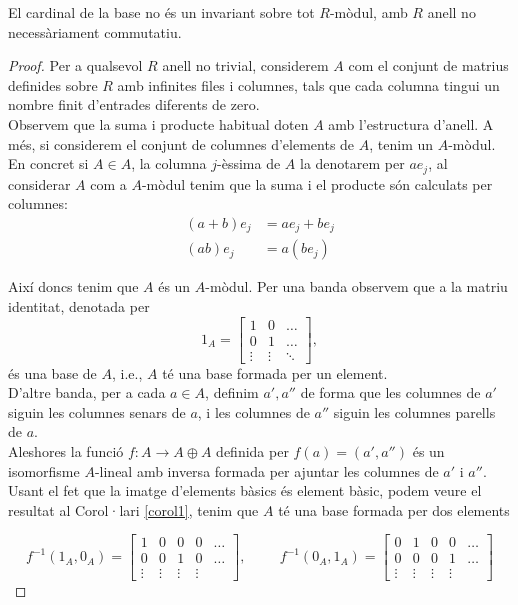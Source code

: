 \begin{prop}
El cardinal de la base no és un invariant sobre tot $R$-mòdul, amb $R$ anell no necessàriament commutatiu.
\end{prop}
\begin{proof}
Per a qualsevol $R$ anell no trivial, considerem $A$ com el conjunt de matrius definides sobre $R$ amb infinites files i columnes, tals que cada columna tingui un nombre finit d'entrades diferents de zero. \\
Observem que la suma i producte habitual doten $A$ amb l'estructura d'anell. A més, si considerem el conjunt de columnes d'elements de $A$, tenim un $A$-mòdul. En concret si $A\in A$, la columna $j$-èssima de $A$ la denotarem per $ae_j$, al considerar $A$ com a $A$-mòdul tenim que la suma i el producte són calculats per columnes:
\begin{eqnarray*}
(a+b)e_j&=ae_j+be_j \\
(ab)e_j &= a(b e_j)
\end{eqnarray*}

Així doncs tenim que $A$ és un $A$-mòdul. Per una banda observem que a la matriu identitat, denotada per 
$$1_{A}=\begin{bmatrix}
1  & 0 & \hdots  \\
0  & 1 & \hdots \\
\vdots & \vdots & \ddots
\end{bmatrix}, 
$$
és una base de $A$, i.e., $A$ té una base formada per un element. \\
\indent D'altre banda, per a cada $a\in A$, definim $a', a''$ de forma que les columnes de $a'$ siguin les columnes senars de $a$, i les columnes de $a''$ siguin les columnes parells de $a$. \\
Aleshores la funció $f: A \rightarrow A \oplus A$ definida per $f(a)=(a', a'')$ és un isomorfisme $A$-lineal amb inversa formada per ajuntar les columnes de $a'$ i $a''$. \\
Usant el fet que la imatge d'elements bàsics és element bàsic, podem veure el resultat al Corol·lari \ref{corol1}, tenim que $A$ té una base formada per dos elements

$$
f^{-1}(1_A,0_A)=\begin{bmatrix}
1  & 0 & 0 & 0 & \hdots  \\
0  & 0 & 1 & 0 & \hdots \\
\vdots & \vdots & \vdots & \vdots & 
\end{bmatrix}
, \hspace{1cm}
f^{-1}(0_A,1_A)=\begin{bmatrix}
0  & 1 & 0 & 0 & \hdots  \\
0  & 0 & 0 & 1 & \hdots \\
\vdots & \vdots & \vdots & \vdots & 
\end{bmatrix}
$$
\end{proof}



